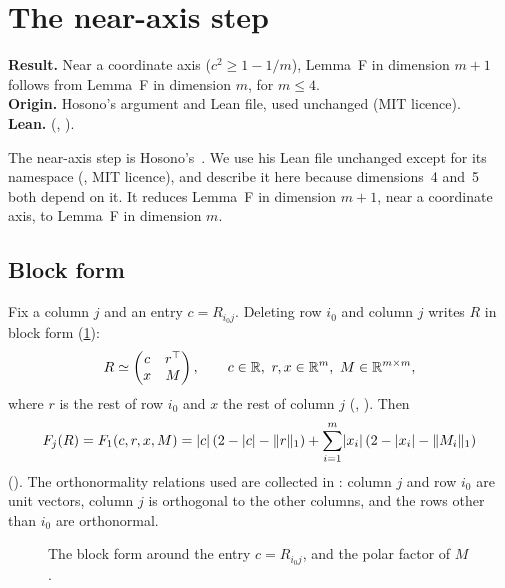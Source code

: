 \documentclass[11pt,a4paper]{article}
\begin{document}
\section{The near-axis step}\label{sec:near}

\begin{summarybox}
\textbf{Result.} Near a coordinate axis ($c^2\ge1-1/m$), Lemma~F in dimension $m+1$ follows from Lemma~F in dimension $m$, for $m\le4$.\\
\textbf{Origin.} Hosono's argument and Lean file, used unchanged (MIT licence).\\
\textbf{Lean.}  (, ).
\end{summarybox}

The near-axis step is Hosono's~\cite{hosono}. We use his Lean file unchanged except for its namespace (, MIT licence), and describe it here because dimensions~4 and~5 both depend on it. It reduces Lemma~F in dimension $m+1$, near a coordinate axis, to Lemma~F in dimension $m$.

\subsection{Block form}
Fix a column $j$ and an entry $c=R_{i_0j}$. Deleting row $i_0$ and column $j$ writes $R$ in block form (\cref{fig:block}):
\[
R\simeq\begin{pmatrix} c & r^\top\\ x & M\end{pmatrix},\qquad c\in\mathbb R,\ r,x\in\mathbb R^m,\ M\in\mathbb R^{m\times m},
\]
where $r$ is the rest of row $i_0$ and $x$ the rest of column $j$ (, ). Then
\[
F_j(R)=F_1(c,r,x,M)=\lvert c\rvert\,(2-\lvert c\rvert-\lVert r\rVert_1)+\sum_{i=1}^m\lvert x_i\rvert\,(2-\lvert x_i\rvert-\lVert M_i\rVert_1)
\]
(). The orthonormality relations used are collected in : column $j$ and row $i_0$ are unit vectors, column $j$ is orthogonal to the other columns, and the rows other than $i_0$ are orthonormal.

\begin{figure}[t]
\centering
{}
\caption{The block form around the entry $c=R_{i_0j}$, and the polar factor of $M$.}
\label{fig:block}
\end{figure}
\end{document}

